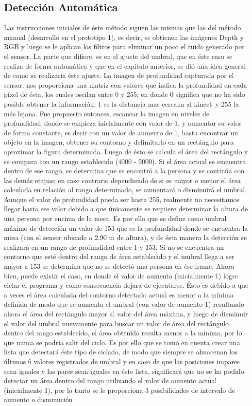 \documentclass[a4paper,openright,12pt]{report}
\begin{document}
\subsection{Detección Automática}
Las instrucciones iniciales de éste método siguen las mismas que las del método manual (desarrollo en el prototipo 1), es decir, se obtienen las imágenes Depth y RGB y luego se le aplican los filtros para eliminar un poco el ruido generado por el sensor. La parte que difiere, es en el ajuste del umbral, que en éste caso se realiza de forma automática y que en el capítulo anterior, se dió una idea general de como se realizaría éste ajuste. La imagen de profundidad capturada por el sensor, nos proporciona una matriz con valores que indica la profundidad en cada píxel de ésta, los cuales oscilan entre 0 y 255; en donde 0 significa que no ha sido posible obtener la información; 1 es la distancia mas cercana al kinect\textcopyright\ y 255 la más lejana. Fue propuesto entonces, escanear la imagen en niveles de profundidad, donde se empieza inicialmente con valor de 1, y aumentar su valor de forma constante, es decir con un valor de aumento de 1, hasta encontrar un objeto en la imagen, obtener su contorno y delimitarlo en un rectángulo para aproximar la figura determinada. Luego de ésto se calcula el área del rectángulo y se compara con un rango establecido (4000 - 9000). Si el área actual se encuentra dentro de ese rango, se determina que se encontró a la persona y se continúa con las demás etapas; en caso contrario dependiendo de si es mayor o menor el área calculada en relación al rango determinado, se aumentará o disminuirá el umbral. Aunque el valor de profundidad pueda ser hasta 255, realmente no necesitamos llegar hasta ese valor debido a que únicamente se requiere determinar la altura de una persona por encima de la mesa. Es por ello que se define como umbral máximo de detección un valor de 153 que es la profundidad donde se encuentra la mesa (con el sensor ubicado a 2.90 m de altura), y de ésta manera la detección se realizará en un rango de profundidad entre 1 y 153. Si no se encuentra un contorno que esté dentro del rango de área establecido y el umbral llega a ser mayor a 153 se determina que no se detectó una persona en ése frame. Ahora bien, puede existir el caso, en donde el valor de aumento (inicialmente 1) logre ciclar el programa y como consecuencia dejara de ejecutarse. Ésto es debido a que a veces el área calculada del contorno detectado actual es menor a la mínima definida de modo que se aumenta el umbral (con valor de aumento 1) resultando ahora el área del rectángulo mayor al valor del área máxima, y luego de disminuir el valor del umbral nuevamente para buscar un valor de área del rectángulo dentro del rango establecido, el área obtenida resulta menor a la mínima, por lo que nunca se podría salir del ciclo. Es por ello que se tomó en cuenta crear una lista que detectará éste tipo de ciclado, de modo que siempre se almacenan los últimos 6 valores registrados de umbral y en caso de que las posiciones impares sean iguales y las pares sean iguales en éste lista, significará que no se ha podido detectar un área dentro del rango utilizando el valor de aumento actual (inicialmente 1), por lo tanto se le proporciona 3 posibilidades de intervalo de aumento o disminución 
\end{document}
